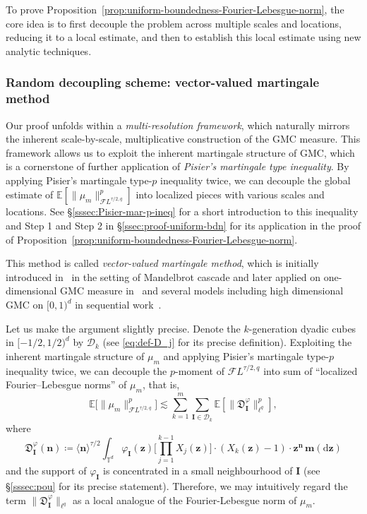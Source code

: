 \documentclass[12pt]{amsart}
\theoremstyle{definition}
\theoremstyle{remark}
\newcommand{\bz}{\boldsymbol{z}}
\newcommand{\E}{\mathbb{E}}
\newcommand{\T}{\mathbb{T}}
\numberwithin{equation}{section}
\begin{document}
To prove Proposition~\ref{prop:uniform-boundedness-Fourier-Lebesgue-norm}, the core idea is to first decouple the problem across multiple scales and locations, reducing it to a local estimate, and then to establish this local estimate using new analytic techniques.

\subsubsection{Random decoupling scheme: vector-valued martingale method}

Our proof unfolds within a \textit{multi-resolution framework}, which naturally mirrors the inherent scale-by-scale, multiplicative construction of the GMC measure. This framework allows us to exploit the inherent martingale structure of GMC, which is a cornerstone of further application of \textit{Pisier's martingale type inequality}. By applying Pisier's martingale type-$p$ inequality twice, we can decouple the global estimate of $\E[\|\mu_m\|_{\mathcal{F}L^{\tau/2,q}}^p]$ into localized pieces with various scales and locations. See \S\ref{sssec:Pisier-mar-p-ineq} for a short introduction to this inequality and Step 1 and Step 2 in \S\ref{ssec:proof-uniform-bdn} for its application in the proof of Proposition~\ref{prop:uniform-boundedness-Fourier-Lebesgue-norm}.

This method is called \textit{vector-valued martingale method}, which is initially introduced in~\cite{CHQW24} in the setting of Mandelbrot cascade and later applied on one-dimensional GMC measure in~\cite{LQT24} and several models including high dimensional GMC on $[0,1)^d$ in sequential work~\cite{LQT25}. 

Let us make the argument slightly precise. Denote the $k$-generation dyadic cubes in $[-1/2,1/2)^d$ by $\mathscr{D}_k$ (see \eqref{eq:def-D_j} for its precise definition). Exploiting the inherent martingale structure of $\mu_m$ and applying Pisier's martingale type-$p$ inequality twice, we can decouple the $p$-moment of $\mathcal{F}L^{\tau/2,q}$ into sum of ``localized Fourier--Lebesgue norms'' of $\mu_m$, that is,
\[
\mathbb{E}\big[\|\mu_m\|_{\mathcal{F}L^{\tau/2,q}}^p\big]\lesssim \sum_{k=1}^m \sum_{\boldsymbol{I}\in \mathscr{D}_k}\mathbb{E}[\|\mathfrak{D}_{\boldsymbol{I}}^\varphi\|_{\ell^q}^p],
\]
where
\begin{equation}\label{eq:intro-def-DIphi}
	\mathfrak{D}_{\boldsymbol{I}}^\varphi(\boldsymbol{n})\coloneq \langle \boldsymbol{n}\rangle^{\tau/2}\int_{\T^d}\varphi_{\boldsymbol{I}}(\bz)\bigg[\prod_{j=1}^{k-1}X_j(\bz)\bigg]\cdot(X_k(\bz)-1)\cdot \bz^{\boldsymbol{n}}\,\boldsymbol{m}(\mathrm{d}\bz)
\end{equation}
and the support of $\varphi_{\boldsymbol{I}}$ is concentrated in a small neighbourhood of $\boldsymbol{I}$ (see \S\ref{sssec:pou} for its precise statement). Therefore, we may intuitively regard the term $\|\mathfrak{D}_{\boldsymbol{I}}^\varphi\|_{\ell^q}$ as a local analogue of the Fourier-Lebesgue norm of $\mu_m$.
\end{document}
